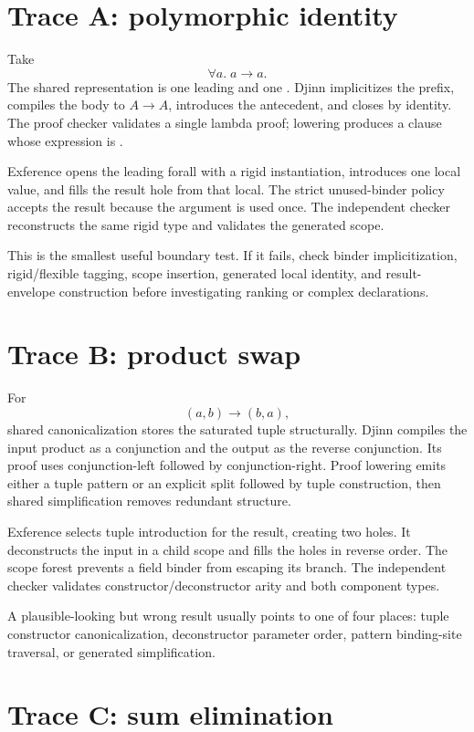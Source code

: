 \documentclass[10pt,letterpaper,oneside]{report}
\newcommand{\code}[1]{\texttt{\detokenize{#1}}}
\begin{document}
\section{Trace A: polymorphic identity}

Take
\[
  \forall a.\;a \to a.
\]
The shared representation is one leading \code{ForallType} and one \code{FunctionType}. Djinn implicitizes the prefix, compiles the body to \(A \to A\), introduces the antecedent, and closes by identity. The proof checker validates a single lambda proof; lowering produces a clause whose expression is \code{Lambda [Bind x] (Local x)}.

Exference opens the leading forall with a rigid instantiation, introduces one local value, and fills the result hole from that local. The strict unused-binder policy accepts the result because the argument is used once. The independent checker reconstructs the same rigid type and validates the generated scope.

This is the smallest useful boundary test. If it fails, check binder implicitization, rigid/flexible tagging, scope insertion, generated local identity, and result-envelope construction before investigating ranking or complex declarations.

\section{Trace B: product swap}

For
\[
  (a,b) \to (b,a),
\]
shared canonicalization stores the saturated tuple structurally. Djinn compiles the input product as a conjunction and the output as the reverse conjunction. Its proof uses conjunction-left followed by conjunction-right. Proof lowering emits either a tuple pattern or an explicit split followed by tuple construction, then shared simplification removes redundant structure.

Exference selects tuple introduction for the result, creating two holes. It deconstructs the input in a child scope and fills the holes in reverse order. The scope forest prevents a field binder from escaping its branch. The independent checker validates constructor/deconstructor arity and both component types.

A plausible-looking but wrong result usually points to one of four places: tuple constructor canonicalization, deconstructor parameter order, pattern binding-site traversal, or generated simplification.

\section{Trace C: sum elimination}
\end{document}
